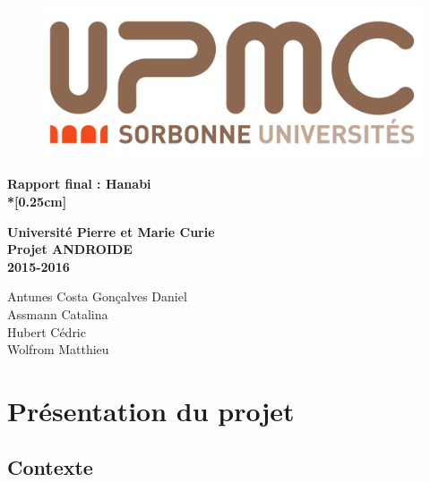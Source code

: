 \documentclass[11pt, letterpaper]{article}
\begin{document}
\pagestyle{fancy}

\renewcommand{\headrulewidth}{1pt}
\rhead{}

\begin{titlepage}

\centering
\begin{figure}[t]
\begin{center}
\includegraphics[scale = 0.2]{upmc.png}
\end{center}
\end{figure}

\begin{center}
\par\vspace {2.5cm}
{\Huge\textbf{Rapport final : Hanabi\\*[0.25cm]}}   
\par\vspace {2cm}
{\Large\textbf{Université Pierre et Marie Curie\\ Projet ANDROIDE\\
               2015-2016}}                   
\par\vspace {2cm}
{\Large{Antunes Costa Gonçalves Daniel}}\\
{\Large{Assmann Catalina}}\\ 
{\Large{Hubert Cédric}}\\ 
{\Large{Wolfrom Matthieu}}\\
\end{center}

\end{titlepage}

\newpage

\tableofcontents

\newpage
{}

\section{Présentation du projet}

\subsection{Contexte}
\end{document}
